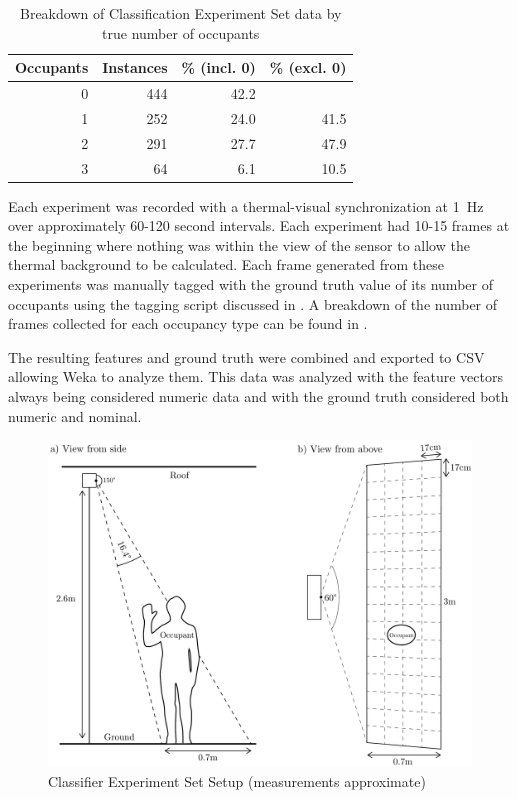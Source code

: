 \documentclass[../thesis/thesis.tex]{subfiles}
\begin{document}
\begin{table}
\centering
\begin{tabular}{|r|r|r|r|}
\hline
\textbf{Occupants} & \textbf{Instances} & \textbf{\% (incl. 0)} & \textbf{\% (excl. 0)} \\ \hline
0                  & 444                & 42.2                  &                       \\ \hline
1                  & 252                & 24.0                  & 41.5                  \\ \hline
2                  & 291                & 27.7                  & 47.9                  \\ \hline
3                  & 64                 & 6.1                   & 10.5                  \\ \hline
\end{tabular}
\caption{Breakdown of Classification Experiment Set data by true number of occupants}
\label{tab:expbreak}
\end{table}

Each experiment was recorded with a thermal-visual synchronization at 1~Hz over approximately 60-120 second intervals. Each experiment had 10-15 frames at the beginning where nothing was within the view of the sensor to allow the thermal background to be calculated. Each frame generated from these experiments was manually tagged with the ground truth value of its number of occupants using the tagging script discussed in . A breakdown of the number of frames collected for each occupancy type can be found in .

The resulting features and ground truth were combined and exported to CSV allowing Weka to analyze them. This data was analyzed with the feature vectors always being considered numeric data and with the ground truth considered both numeric and nominal.

\begin{landscape}
 \begin{figure}
 \centering
 \includegraphics[height=\textheight]{../diagrams/third-exp-setup2.pdf}
 \caption{Classifier Experiment Set Setup (measurements approximate)}
 \label{fig:exps:3setup}
 \end{figure}
\end{landscape}
\end{document}
